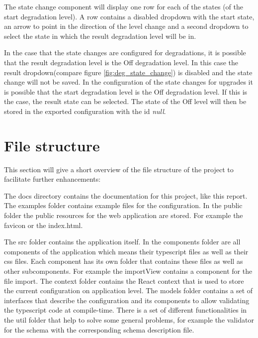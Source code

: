 \noindent The state change component will display one row for each of the states (of the start degradation level). A row contains a disabled dropdown with the start state, an arrow to point in the direction of the level change and a second dropdown to select the state in which the result degradation level will be in.

In the case that the state changes are configured for degradations, it is possible that the result degradation level is the Off degradation level. In this case the result dropdown(compare figure \ref{fig:deg_state_change}) is disabled and the state change will not be saved. In the configuration of the state changes for upgrades it is possible that the start degradation level is the Off degradation level. If this is the case, the result state can be selected. The state of the Off level will then be stored in the exported configuration with the id \textit{null}. 

\newpage

\section{File structure}
This section will give a short overview of the file structure of the project to facilitate further enhancements:

\hfill

The docs directory contains the documentation for this project, like this report. The examples folder contains example files for the configuration. In the public folder the public resources for the web application are stored. For example the favicon or the index.html.

The src folder contains the application itself. In the components folder are all components of the application which means their typescript files as well as their css files. Each component has its own folder that contains these files as well as other subcomponents. For example the importView contains a component for the file import. The context folder contains the React context that is used to store the current configuration on application level. The models folder contains a set of interfaces that describe the configuration and its components to allow validating the typescript code at compile-time. There is a set of different functionalities in the util folder that help to solve some general problems, for example the validator for the schema with the corresponding schema description file.

